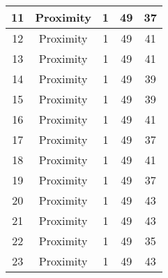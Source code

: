 \documentclass[results.tex]{subfiles}
\begin{document}
\begin{center}
\begin{tabular}{| c || c | c | c | c |}
            \hline
            11                      & Proximity                    & 1                      & 49                      & 37                   \\
            \hline
            12                      & Proximity                    & 1                      & 49                      & 41                   \\
            \hline
            13                      & Proximity                    & 1                      & 49                      & 41                   \\
            \hline
            14                      & Proximity                    & 1                      & 49                      & 39                   \\
            \hline
            15                      & Proximity                    & 1                      & 49                      & 39                   \\
            \hline
            16                      & Proximity                    & 1                      & 49                      & 41                   \\
            \hline
            17                      & Proximity                    & 1                      & 49                      & 37                   \\
            \hline
            18                      & Proximity                    & 1                      & 49                      & 41                   \\
            \hline
            19                      & Proximity                    & 1                      & 49                      & 37                   \\
            \hline
            20                      & Proximity                    & 1                      & 49                      & 43                   \\
            \hline
            21                      & Proximity                    & 1                      & 49                      & 43                   \\
            \hline
            22                      & Proximity                    & 1                      & 49                      & 35                   \\
            \hline
            23                      & Proximity                    & 1                      & 49                      & 43                   \\

\end{tabular}
\end{center}
\end{document}
